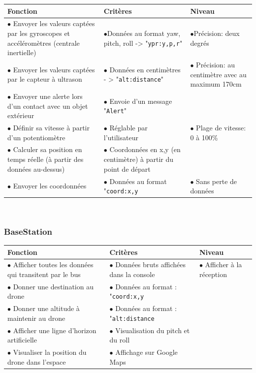 \documentclass[12pt,a4paper]{article}
\begin{document}
\begin{tabular}{|p{6cm}|p{5cm}|p{5cm}|}
	\hline
       Fonction  & Critères  & Niveau\\
    \hline
		$\bullet$ Envoyer les valeurs captées par les gyroscopes et accéléromètres (centrale inertielle) & $\bullet$Données au format yaw, pitch, roll -> "\texttt{ypr:y,p,r}" & $\bullet$Précision: deux degrés \\
		$\bullet$ Envoyer les valeurs captées par le capteur à ultrason & $\bullet$ Données en centimètres - > "\texttt{alt:distance}" & $\bullet$ Précision: au centimètre avec au maximum 170cm\\

		$\bullet$ Envoyer une alerte lors d'un contact avec un objet extérieur & $\bullet$ Envoie d'un message "\texttt{Alert}" & \\

		$\bullet$ Définir sa vitesse à partir d'un potentiomètre & $\bullet$ Réglable par l'utilisateur & $\bullet$ Plage de vitesse: 0 à 100\%\\
		$\bullet$ Calculer sa position en temps réelle (à partir des données au-dessus)  & $\bullet$ Coordonnées en x,y (en centimètre) à partir du point de départ & \\
    	$\bullet$ Envoyer les coordonnées & $\bullet$ Données au format "\texttt{coord:x,y} & $\bullet$ Sans perte de données\\
    \hline
\end{tabular}\\
	

\subsubsection{BaseStation}



\begin{tabular}{|p{6cm}|p{5cm}|p{5cm}|}
	\hline
       Fonction  & Critères  & Niveau\\
    \hline
    	$\bullet$ Afficher toutes les données qui transitent par le bus & $\bullet$ Données bruts affichées dans la console & $\bullet$ Afficher à la réception\\
		$\bullet$ Donner une destination au drone & $\bullet$ Données au format : "\texttt{coord:x,y} & \\
      	$\bullet$ Donner une altitude à maintenir au drone & $\bullet$ Données au format : "\texttt{alt:distance} & \\
      	$\bullet$ Afficher une ligne d'horizon artificielle & $\bullet$ Visualisation du pitch et du roll & \\
		$\bullet$ Visualiser la position du drone dans l'espace & $\bullet$ Affichage sur Google Maps & \\
    \hline
\end{tabular}\\
\end{document}
